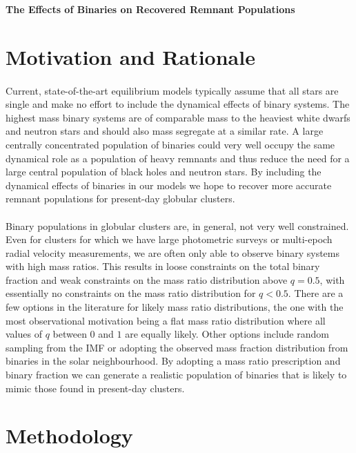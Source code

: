 \documentclass[12pt,letterpaper]{article}
\begin{document}
\begin{center}
	\Large{\textbf{The Effects of Binaries on Recovered Remnant Populations}}
\end{center}


\section{Motivation and Rationale}
\paragraph{}
Current, state-of-the-art equilibrium models typically assume that all stars are single and make no
effort to include the dynamical effects of binary systems. The highest mass binary systems are of
comparable mass to the heaviest white dwarfs and neutron stars and should also mass segregate at a
similar rate. A large centrally concentrated population of binaries could very well occupy the same
dynamical role as a population of heavy remnants and thus reduce the need for a large central
population of black holes and neutron stars. By including the dynamical effects of binaries in our
models we hope to recover more accurate remnant populations for present-day globular clusters.


\paragraph{}
Binary populations in globular clusters are, in general, not very well constrained. Even for
clusters for which we have large photometric surveys or multi-epoch radial velocity measurements, we
are often only able to observe binary systems with high mass ratios. This results in loose
constraints on the total binary fraction and weak constraints on the mass ratio distribution above
$q = 0.5$, with essentially no constraints on the mass ratio distribution for $q < 0.5$. There are a
few options in the literature for likely mass ratio distributions, the one with the most
observational motivation being a flat mass ratio distribution where all values of $q$ between $0$
and $1$ are equally likely. Other options include random sampling from the IMF or adopting the
observed mass fraction distribution from binaries in the solar neighbourhood. By adopting a mass
ratio prescription and binary fraction we can generate a realistic population of binaries that is
likely to mimic those found in present-day clusters.



\section{Methodology}
\end{document}
